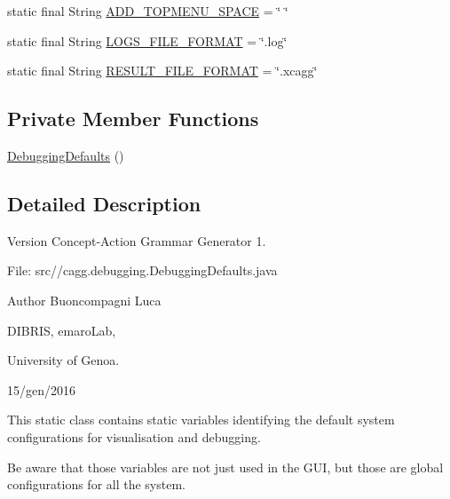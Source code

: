 \begin{DoxyCompactItemize}
\item 
static final String \hyperlink{classit_1_1emarolab_1_1cagg_1_1debugging_1_1DebuggingDefaults_a5c0d10c1d4825146dab96ec01c3e94df}{A\-D\-D\-\_\-\-T\-O\-P\-M\-E\-N\-U\-\_\-\-S\-P\-A\-C\-E} = \char`\"{} \char`\"{}
\item 
static final String \hyperlink{classit_1_1emarolab_1_1cagg_1_1debugging_1_1DebuggingDefaults_ae767f9af1e7b670473d85ab357062d1a}{L\-O\-G\-S\-\_\-\-F\-I\-L\-E\-\_\-\-F\-O\-R\-M\-A\-T} = \char`\"{}.log\char`\"{}
\item 
static final String \hyperlink{classit_1_1emarolab_1_1cagg_1_1debugging_1_1DebuggingDefaults_ac8aa784986458ca02636c8ebd74a049e}{R\-E\-S\-U\-L\-T\-\_\-\-F\-I\-L\-E\-\_\-\-F\-O\-R\-M\-A\-T} = \char`\"{}.xcagg\char`\"{}
\end{DoxyCompactItemize}
\subsection*{Private Member Functions}
\begin{DoxyCompactItemize}
\item 
\hyperlink{classit_1_1emarolab_1_1cagg_1_1debugging_1_1DebuggingDefaults_a81e9d969acbd6a275df16e3e53f3440e}{Debugging\-Defaults} ()
\end{DoxyCompactItemize}


\subsection{Detailed Description}
\begin{DoxyVersion}{Version}
Concept-\/\-Action Grammar Generator 1. \par
 File\-: src//cagg.debugging.\-Debugging\-Defaults.\-java \par

\end{DoxyVersion}
\begin{DoxyAuthor}{Author}
Buoncompagni Luca \par
 D\-I\-B\-R\-I\-S, emaro\-Lab,\par
 University of Genoa. \par
 15/gen/2016 \par

\end{DoxyAuthor}


This static class contains static variables identifying the default system configurations for visualisation and debugging.\par
 Be aware that those variables are not just used in the G\-U\-I, but those are global configurations for all the system. 


